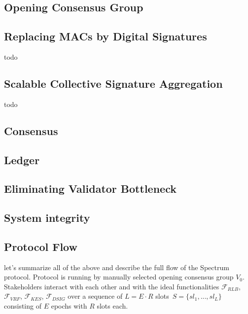 \subsection{Opening Consensus Group}\label{subsec:opening-consensus-group-and-leaders}


\subsection{Replacing MACs by Digital Signatures}\label{subsec:replacing-macs-by-digital-signatures}

todo

\subsection{Scalable Collective Signature Aggregation}\label{subsec:scalable-collective-signature-aggregation}

todo

\subsection{Consensus}\label{subsec:consensus}


\subsection{Ledger}\label{subsec:ledger}


\subsection{Eliminating Validator Bottleneck}\label{subsec:eliminating-validator-bottleneck}


\subsection{System integrity}\label{subsec:system-integrity}


\subsection{Protocol Flow}\label{subsec:protocol-flow}
let's summarize all of the above and describe the full flow of the Spectrum protocol.
Protocol is running by manually selected opening consensus group $V_0$.
Stakeholders interact with each other and with the ideal functionalities ${\mathcal{F}}_{RLB}$,\
${\mathcal{F}}_{VRF}$, ${\mathcal{F}}_{KES}$, ${\mathcal{F}}_{DSIG}$ over a sequence of $L = E \cdot R$ slots\
${S=\{sl_1,...,sl_L\}}$ consisting of $E$ epochs with $R$ slots each.

